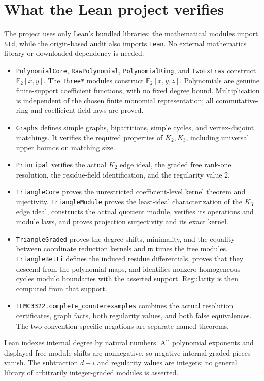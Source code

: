 \documentclass[11pt]{article}
\newcommand{\F}{\mathbb F_2}
\begin{document}
\section{What the Lean project verifies}
The project uses only Lean's bundled libraries: the mathematical modules import \texttt{Std}, while the origin-based audit also imports \texttt{Lean}. No external mathematics library or downloaded dependency is needed.
\begin{itemize}
\item \texttt{PolynomialCore}, \texttt{RawPolynomial}, \texttt{PolynomialRing}, and \texttt{TwoExtras} construct $\F[x,y]$. The \texttt{Three*} modules construct $\F[x,y,z]$. Polynomials are genuine finite-support coefficient functions, with no fixed degree bound. Multiplication is independent of the chosen finite monomial representation; all commutative-ring and coefficient-field laws are proved.
\item \texttt{Graphs} defines simple graphs, bipartitions, simple cycles, and vertex-disjoint matchings. It verifies the required properties of $K_2,K_3$, including universal upper bounds on matching size.
\item \texttt{Principal} verifies the actual $K_2$ edge ideal, the graded free rank-one resolution, the residue-field identification, and the regularity value $2$.
\item \texttt{TriangleCore} proves the unrestricted coefficient-level kernel theorem and injectivity. \texttt{TriangleModule} proves the least-ideal characterization of the $K_3$ edge ideal, constructs the actual quotient module, verifies its operations and module laws, and proves projection surjectivity and its exact kernel.
\item \texttt{TriangleGraded} proves the degree shifts, minimality, and the equality between coordinate reduction kernels and $\mathfrak m$ times the free modules. \texttt{TriangleBetti} defines the induced residue differentials, proves that they descend from the polynomial maps, and identifies nonzero homogeneous cycles modulo boundaries with the asserted support. Regularity is then computed from that support.
\item \texttt{TLMC3322.complete\_counterexamples} combines the actual resolution certificates, graph facts, both regularity values, and both false equivalences. The two convention-specific negations are separate named theorems.
\end{itemize}

Lean indexes internal degree by natural numbers. All polynomial exponents and displayed free-module shifts are nonnegative, so negative internal graded pieces vanish. The subtraction $d-i$ and regularity values are integers; no general library of arbitrarily integer-graded modules is asserted.
\end{document}
